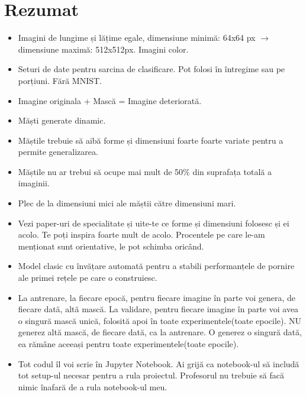\documentclass[12pt, a4paper]{article}
\begin{document}
\section{Rezumat}
\begin{itemize}
    \item Imagini de lungime și lățime egale, dimensiune minimă: 64x64 px $\rightarrow$ dimensiune maximă: 512x512px. Imagini color.
    \item Seturi de date pentru sarcina de clasificare. Pot folosi în întregime sau pe porțiuni. Fără MNIST.
    \item Imagine originala + Mască = Imagine deteriorată.
    \item Măști generate dinamic.
    \item Măștile trebuie să aibă forme și dimensiuni foarte foarte variate pentru a permite generalizarea.
    \item Măștile nu ar trebui să ocupe mai mult de 50\% din suprafața totală a imaginii.
    \item Plec de la dimensiuni mici ale măștii către dimensiuni mari.
    \item Vezi paper-uri de specialitate și uite-te ce forme și dimensiuni folosesc și ei acolo. Te poți inspira foarte mult de acolo. Procentele pe care le-am menționat sunt orientative, le pot schimba oricând.
    \item Model clasic cu învățare automată pentru a stabili performanțele de pornire ale primei rețele pe care o construiesc.
    \item La antrenare, la fiecare epocă, pentru fiecare imagine în parte voi genera, de fiecare dată, altă mască. La validare, pentru fiecare imagine în parte voi avea o singură mască unică, folosită apoi în toate experimentele(toate epocile). NU generez altă mască, de fiecare dată, ca la antrenare. O generez o singură dată, ea rămâne aceeași pentru toate experimentele(toate epocile).
    \item Tot codul îl voi scrie în Jupyter Notebook. Ai grijă ca notebook-ul să includă tot setup-ul necesar pentru a rula proiectul. Profesorul nu trebuie să facă nimic înafară de a rula notebook-ul meu.
\end{itemize}
\end{document}
